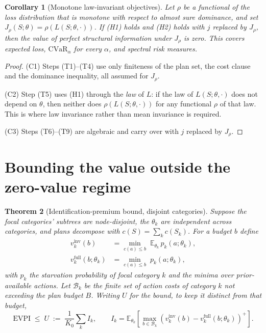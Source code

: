 \documentclass[pdflatex,sn-mathphys-num]{sn-jnl}
\theoremstyle{thmstyleone}
\newtheorem{theorem}{Theorem}
\newtheorem{corollary}[theorem]{Corollary}
\theoremstyle{thmstyletwo}
\theoremstyle{thmstylethree}
\newcommand{\evpi}{\mathrm{EVPI}}
\newcommand{\cvar}{\mathrm{CVaR}}
\newcommand{\ubound}{U}
\begin{document}
\begin{corollary}[Monotone law-invariant objectives]\label{cor:lawinv}
Let $\rho$ be a functional of the loss distribution that is monotone with
respect to almost sure dominance, and set
$J_\rho(S;\theta)=\rho(L(S;\theta,\cdot))$. If (H1) holds and (H2) holds
with $j$ replaced by $J_\rho$, then the value of perfect structural
information under $J_\rho$ is zero. This covers expected loss,
$\cvar_\alpha$ for every $\alpha$, and spectral risk measures.
\end{corollary}

\begin{proof}
(C1) Steps (T1)--(T4) use only finiteness of the plan set, the cost clause
and the dominance inequality, all assumed for $J_\rho$.

\noindent(C2) Step (T5) uses (H1) through the \emph{law} of $L$: if the law
of $L(S;\theta,\cdot)$ does not depend on $\theta$, then neither does
$\rho(L(S;\theta,\cdot))$ for any functional $\rho$ of that law. This is
where law invariance rather than mean invariance is required.

\noindent(C3) Steps (T6)--(T9) are algebraic and carry over with $j$
replaced by $J_\rho$.
\end{proof}

\section{Bounding the value outside the zero-value regime}\label{sec:bound}

\begin{theorem}[Identification-premium bound, disjoint categories]
\label{thm:premium}
Suppose the focal categories' subtrees are node-disjoint, the $\theta_k$ are
independent across categories, and plans decompose with
$c(S)=\sum_k c(S_k)$. For a budget $b$ define
\begin{align}
v_k^{\mathrm{inv}}(b)&=\min_{c(a)\le b}\;
\mathbb{E}_{\theta_k}\,p_k(a;\theta_k),\\
v_k^{\mathrm{full}}(b;\theta_k)&=\min_{c(a)\le b}\;p_k(a;\theta_k),
\end{align}
with $p_k$ the starvation probability of focal category $k$ and the minima
over prior-available actions. Let $\mathcal{B}_k$ be the finite set of action
costs of category $k$ not exceeding the plan budget $B$. Writing $\ubound$
for the bound, to keep it distinct from that budget,
\begin{equation}
\evpi\;\le\;\ubound\;:=\;\frac{1}{K_0}\sum_k I_k,
\qquad
I_k=\mathbb{E}_{\theta_k}\!\left[\max_{b\in\mathcal{B}_k}
\left(v_k^{\mathrm{inv}}(b)-v_k^{\mathrm{full}}(b;\theta_k)\right)^{\!+}
\right].
\label{eq:premium}
\end{equation}
\end{theorem}
\end{document}
